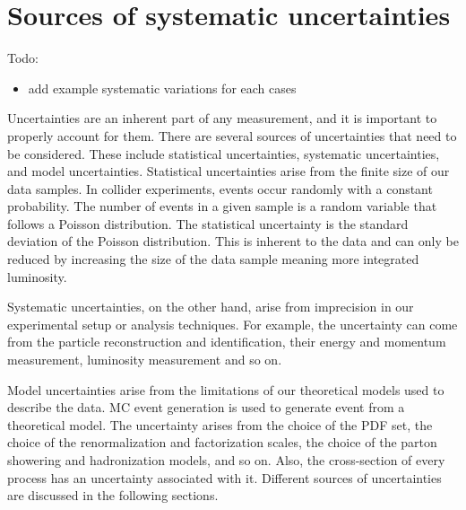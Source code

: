 \chapter{Sources of systematic uncertainties}
\label{sec:sources-of-uncertainties}
Todo: 
\begin{itemize}
    \item add example systematic variations for each cases 
\end{itemize}
Uncertainties are an inherent part of any measurement, and it is important to properly account for them. There are several sources of uncertainties that need to be considered. These include statistical uncertainties, systematic uncertainties, and model uncertainties. Statistical uncertainties arise from the finite size of our data samples. In collider experiments, events occur randomly with a constant probability. The number of events in a given sample is a random variable that follows a Poisson distribution. The statistical uncertainty is the standard deviation of the Poisson distribution. This is inherent to the data and can only be reduced by increasing the size of the data sample meaning more integrated luminosity.

Systematic uncertainties, on the other hand, arise from imprecision in our experimental setup or analysis techniques. For example, the uncertainty can come from the particle reconstruction and identification, their energy and momentum measurement, luminosity measurement and so on.

Model uncertainties arise from the limitations of our theoretical models used to describe the data. MC event generation is used to generate event from a theoretical model. The uncertainty arises from the choice of the PDF set, the choice of the renormalization and factorization scales, the choice of the parton showering and hadronization models, and so on. Also, the cross-section of every process has an uncertainty associated with it. Different sources of uncertainties are discussed in the following sections. 

